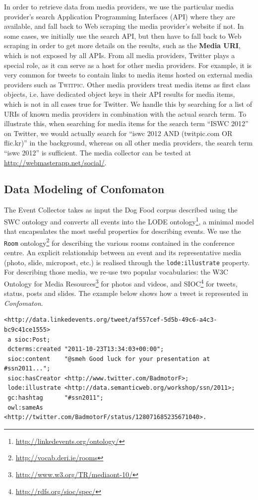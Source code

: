 In order to retrieve data from media providers, we use the particular media provider's search Application Programming Interfaces (API) where they are available, and fall back to Web scraping the media provider's website if not. In some cases, we initially use the search API, but then have to fall back to Web scraping in order to get more details on the results, such as the \textbf{Media URI}, which is not exposed by all APIs. From all media providers, Twitter plays a special role, as it can serve as a host for other media providers. For example, it is very common for tweets to contain links to media items hosted on external media providers such as \textsc{Twitpic}. Other media providers treat media items as first class objects, i.e. have dedicated object keys in their API results for media items, which is not in all cases true for Twitter. We handle this by searching for a list of URIs of known media providers in combination with the actual search term. To illustrate this, when searching for media items for the search term ``ISWC 2012'' on Twitter, we would actually search for ``iswc 2012 AND (twitpic.com OR flic.kr)'' in the background, whereas on all other media providers, the search term ``iswc 2012'' is sufficient. The media collector can be tested at \url{http://webmasterapp.net/social/}.

\subsection{Data Modeling of Confomaton}
The Event Collector takes as input the Dog Food corpus described using the SWC ontology and converts all events into the LODE ontology\footnote{\url{http://linkedevents.org/ontology/}}, a minimal model that encapsulates the most useful properties for describing events. We use the \texttt{Room} ontology\footnote{\url{http://vocab.deri.ie/rooms}} for describing the various rooms contained in the conference centre. An explicit relationship between an event and its representative media (photo, slide, micropost, etc.) is realised through the \texttt{lode:illustrate} property. For describing those media, we re-use two popular vocabularies: the W3C Ontology for Media Resources\footnote{\url{http://www.w3.org/TR/mediaont-10/}} for photos and videos, and SIOC\footnote{\url{http://rdfs.org/sioc/spec/}} for tweets, status, posts and slides. The example below shows how a tweet is represented in \emph{Confomaton}.
{\footnotesize 	
\begin{verbatim}
<http://data.linkedevents.org/tweet/af557cef-5d5b-49c6-a4c3-bc9c41ce1555>
 a sioc:Post;
 dcterms:created "2011-10-23T13:34:03+00:00";
 sioc:content    "@smeh Good luck for your presentation at #ssn2011...";
 sioc:hasCreator <http://www.twitter.com/BadmotorF>;
 lode:illustrate <http://data.semanticweb.org/workshop/ssn/2011>;
 gc:hashtag      "#ssn2011";
 owl:sameAs      <http://twitter.com/BadmotorF/status/128071685235671040>.
\end{verbatim}
}

